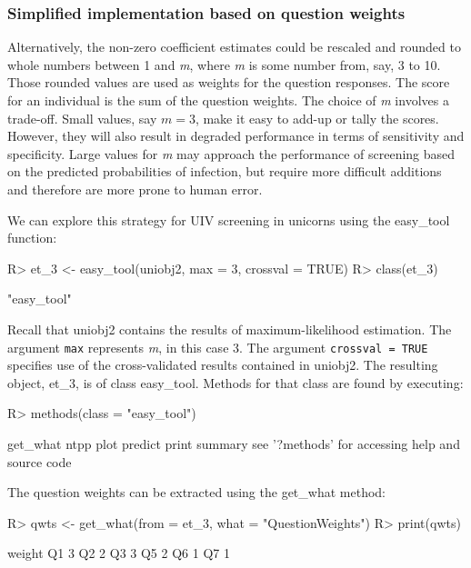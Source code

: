 \documentclass[11pt]{report}
\renewenvironment{Schunk}{\vspace{\topsep}}{\vspace{\topsep}}
\begin{document}
\subsubsection*{Simplified implementation based on question weights}

Alternatively, the non-zero coefficient estimates could be rescaled
and rounded to whole numbers between 1 and \emph{m}, where \emph{m} is
some number from, say, 3 to 10. Those rounded values are used as
weights for the question responses. The score for an individual is the
sum of the question weights.  The choice of \emph{m} involves a
trade-off. Small values, say $m = 3$, make it easy to add-up or tally
the scores. However, they will also result in degraded performance in
terms of sensitivity and specificity. Large values for \emph{m} may
approach the performance of screening based on the predicted
probabilities of infection, but require more difficult additions and
therefore are more prone to human error.

We can explore this strategy for UIV screening in unicorns using the
\textsf{easy\_tool} function:
\begin{Schunk}
\begin{Sinput}
R> et_3 <- easy_tool(uniobj2, max = 3, crossval = TRUE)
R> class(et_3)
\end{Sinput}
\begin{Soutput}
[1] "easy_tool"
\end{Soutput}
\end{Schunk}
Recall that \textsf{uniobj2} contains the results of
maximum-likelihood estimation. The argument \verb|max| represents
\emph{m}, in this case 3.  The argument \verb|crossval = TRUE|
specifies use of the cross-validated results contained in
\textsf{uniobj2}.  The resulting object, \textsf{et\_3}, is of class
\textsf{easy\_tool}.  Methods for that class are found by executing:
\begin{Schunk}
\begin{Sinput}
R> methods(class = "easy_tool")
\end{Sinput}
\begin{Soutput}
[1] get_what ntpp     plot     predict  print    summary
see '?methods' for accessing help and source code
\end{Soutput}
\end{Schunk}

The question weights can be extracted using the \textsf{get\_what} method:
\begin{Schunk}
\begin{Sinput}
R> qwts <- get_what(from = et_3, what = "QuestionWeights")
R> print(qwts)
\end{Sinput}
\begin{Soutput}
   weight
Q1      3
Q2      2
Q3      3
Q5      2
Q6      1
Q7      1
\end{Soutput}
\end{Schunk}
\end{document}
